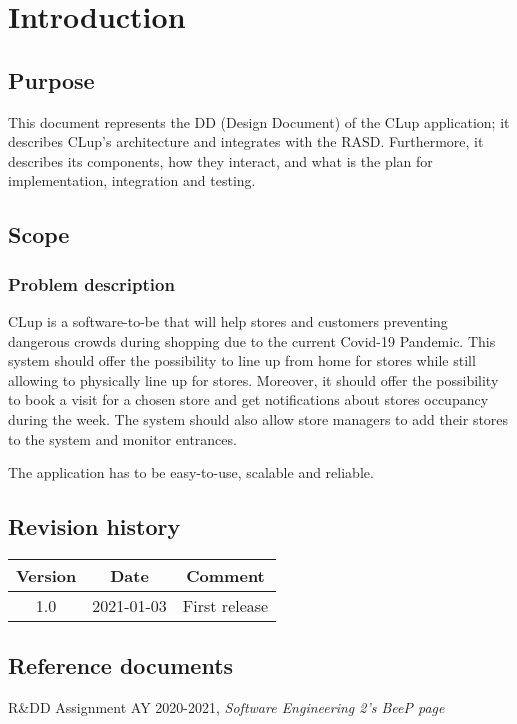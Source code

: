 
\section{Introduction}
\label{sect:intro}

\subsection{Purpose}
This document represents the DD (Design Document) of the CLup application; it describes CLup's architecture and integrates with the RASD. Furthermore, it describes its components, how they interact, and what is the plan for implementation, integration and testing.

\subsection{Scope}
\subsubsection{Problem description}
CLup is a software-to-be that will help stores and customers preventing dangerous crowds during shopping due to the current Covid-19 Pandemic. This system should offer the possibility to line up from home for stores while still allowing to physically line up for stores. Moreover, it should offer the possibility to book a visit for a chosen store and get notifications about stores occupancy during the week.
The system should also allow store managers to add their stores to the system and monitor entrances.

The application has to be easy-to-use, scalable and reliable.



\subsection{Revision history}
\begin{center}
	\begin{tabular}{c | c | c}	
		Version & Date & Comment \\ \hline
		1.0 & 2021-01-03 & First release
	\end{tabular}
\end{center}

\subsection{Reference documents}
R\&DD Assignment AY 2020-2021, \textit{Software Engineering 2's BeeP page}

